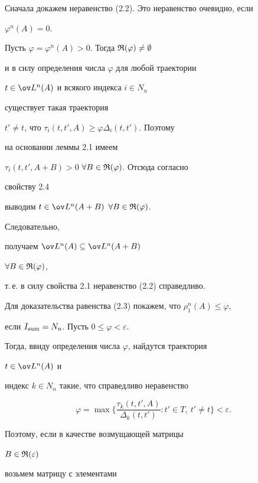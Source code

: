 \begin{pf} 


Сначала докажем неравенство (2.2). Это неравенство очевидно, если 


$\varphi^n(A)=0$. 


 


Пусть $\varphi=\varphi^n(A)>0$. Тогда $\frak R(\varphi)\ne\emptyset$ 


и в силу определения числа $\varphi$ для любой траектории 


$t\in\ov L^n(A)$ и всякого индекса $i\in N_n$ 


существует такая траектория 


$t'\ne t$, что $\tau_i(t,t',A)\ge\varphi\Delta_i(t,t')$. Поэтому 


на основании леммы 2.1 имеем 


$\tau_i(t,t',A+B)>0$ $\forall B\in\frak R(\varphi)$. Отсюда согласно 


свойству 2.4 


выводим $t\in\ov L^n(A+B)$ $\forall B\in\frak R(\varphi)$. 


Следовательно, 


получаем $\ov L^n(A)\subseteq\ov L^n(A+B)$ 


$\forall B\in\frak R(\varphi)$, 


т.\,е.{} в силу свойства 2.1 неравенство (2.2) справедливо. 


 


Для доказательства равенства (2.3) покажем, что $\rho^n_1(A)\le\varphi$, 


если $I_{\operatorname{sum}}=N_n$. Пусть $0\le\varphi<\varepsilon$. 


Тогда, ввиду определения числа $\varphi$, найдутся траектория 


$t\in\ov L^n(A)$ и 


индекс $k\in N_n$ такие, что справедливо неравенство 


\begin{equation} 


\varphi=\max\bigg\{\frac{\tau_k(t,t',A)}{\Delta_k(t,t')}: 


t'\in T,\ t'\ne t\bigg\}<\varepsilon. 


\end{equation} 


Поэтому, если в качестве возмущающей матрицы 


$B\in\frak R(\varepsilon)$ 


возьмем матрицу с элементами 



\end{pf}
